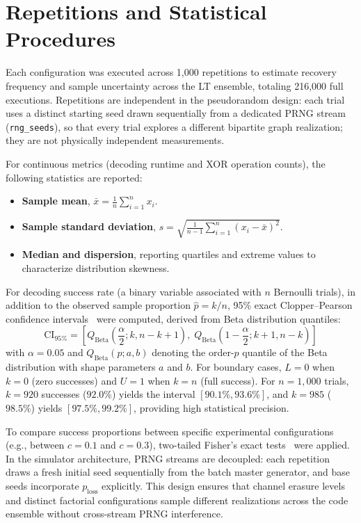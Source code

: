 \section{Repetitions and Statistical Procedures}
\label{sec:repetitions_and_statistics}

Each configuration was executed across 1,000 repetitions to estimate recovery frequency and sample uncertainty across the LT ensemble, totaling 216,000 full executions. Repetitions are independent in the pseudorandom design: each trial uses a distinct starting seed drawn sequentially from a dedicated PRNG stream (\texttt{rng\_seeds}), so that every trial explores a different bipartite graph realization; they are not physically independent measurements.

For continuous metrics (decoding runtime and XOR operation counts), the following statistics are reported:
\begin{itemize}
    \item \textbf{Sample mean}, $\bar{x} = \frac{1}{n} \sum_{i=1}^{n} x_i$.
    \item \textbf{Sample standard deviation}, $s = \sqrt{\frac{1}{n-1} \sum_{i=1}^{n} (x_i - \bar{x})^2}$.
    \item \textbf{Median and dispersion}, reporting quartiles and extreme values to characterize distribution skewness.
\end{itemize}

For decoding success rate (a binary variable associated with $n$ Bernoulli trials), in addition to the observed sample proportion $\hat{p} = k/n$, 95\% exact Clopper--Pearson confidence intervals~\cite{clopper1934} were computed, derived from Beta distribution quantiles:
\begin{equation}
    \label{eq:clopper_pearson}
    \text{CI}_{95\%} = \left[ Q_{\text{Beta}}\!\left(\frac{\alpha}{2}; k, n - k + 1\right), \; Q_{\text{Beta}}\!\left(1 - \frac{\alpha}{2}; k + 1, n - k\right) \right]
\end{equation}
with $\alpha = 0.05$ and $Q_{\text{Beta}}(p; a, b)$ denoting the order-$p$ quantile of the Beta distribution with shape parameters $a$ and $b$. For boundary cases, $L = 0$ when $k = 0$ (zero successes) and $U = 1$ when $k = n$ (full success). For $n = 1{,}000$ trials, $k = 920$ successes ($92.0\%$) yields the interval $[90.1\%, 93.6\%]$, and $k = 985$ ($98.5\%$) yields $[97.5\%, 99.2\%]$, providing high statistical precision.

To compare success proportions between specific experimental configurations (e.g., between $c=0.1$ and $c=0.3$), two-tailed Fisher's exact tests~\cite{fisher1922} were applied. In the simulator architecture, PRNG streams are decoupled: each repetition draws a fresh initial seed sequentially from the batch master generator, and base seeds incorporate $p_{\text{loss}}$ explicitly. This design ensures that channel erasure levels and distinct factorial configurations sample different realizations across the code ensemble without cross-stream PRNG interference.


